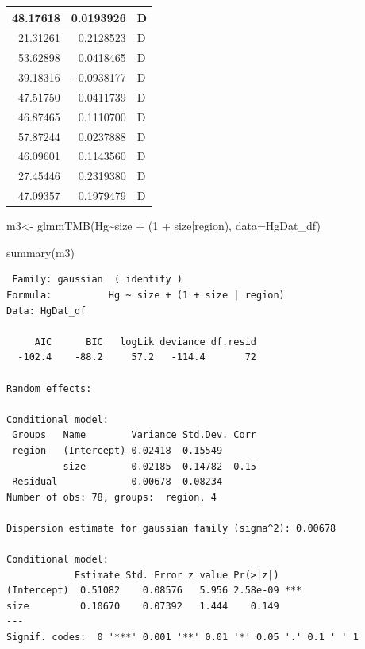 \documentclass[
  letterpaper,
  DIV=11,
  numbers=noendperiod]{scrartcl}
\newenvironment{Shaded}{\begin{snugshade}}{\end{snugshade}}
\newcommand{\AttributeTok}[1]{\textcolor[rgb]{0.40,0.45,0.13}{#1}}
\newcommand{\DecValTok}[1]{\textcolor[rgb]{0.68,0.00,0.00}{#1}}
\newcommand{\FunctionTok}[1]{\textcolor[rgb]{0.28,0.35,0.67}{#1}}
\newcommand{\NormalTok}[1]{\textcolor[rgb]{0.00,0.23,0.31}{#1}}
\newcommand{\OtherTok}[1]{\textcolor[rgb]{0.00,0.23,0.31}{#1}}
\newcommand{\SpecialCharTok}[1]{\textcolor[rgb]{0.37,0.37,0.37}{#1}}
\begin{document}
\begin{table}
\begin{tabular}[t]{r|r|l}
\hline
48.17618 & 0.0193926 & D\\
\hline
21.31261 & 0.2128523 & D\\
\hline
53.62898 & 0.0418465 & D\\
\hline
39.18316 & -0.0938177 & D\\
\hline
47.51750 & 0.0411739 & D\\
\hline
46.87465 & 0.1110700 & D\\
\hline
57.87244 & 0.0237888 & D\\
\hline
46.09601 & 0.1143560 & D\\
\hline
27.45446 & 0.2319380 & D\\
\hline
47.09357 & 0.1979479 & D\\
\hline
\end{tabular}
\end{table}

\begin{Shaded}
\begin{Highlighting}[]
\NormalTok{m3}\OtherTok{\textless{}{-}} \FunctionTok{glmmTMB}\NormalTok{(Hg}\SpecialCharTok{\textasciitilde{}}\NormalTok{size }\SpecialCharTok{+}\NormalTok{ (}\DecValTok{1} \SpecialCharTok{+}\NormalTok{ size}\SpecialCharTok{|}\NormalTok{region), }\AttributeTok{data=}\NormalTok{HgDat\_df)}

\FunctionTok{summary}\NormalTok{(m3)}
\end{Highlighting}
\end{Shaded}

\begin{verbatim}
 Family: gaussian  ( identity )
Formula:          Hg ~ size + (1 + size | region)
Data: HgDat_df

     AIC      BIC   logLik deviance df.resid 
  -102.4    -88.2     57.2   -114.4       72 

Random effects:

Conditional model:
 Groups   Name        Variance Std.Dev. Corr 
 region   (Intercept) 0.02418  0.15549       
          size        0.02185  0.14782  0.15 
 Residual             0.00678  0.08234       
Number of obs: 78, groups:  region, 4

Dispersion estimate for gaussian family (sigma^2): 0.00678 

Conditional model:
            Estimate Std. Error z value Pr(>|z|)    
(Intercept)  0.51082    0.08576   5.956 2.58e-09 ***
size         0.10670    0.07392   1.444    0.149    
---
Signif. codes:  0 '***' 0.001 '**' 0.01 '*' 0.05 '.' 0.1 ' ' 1
\end{verbatim}
\end{document}
